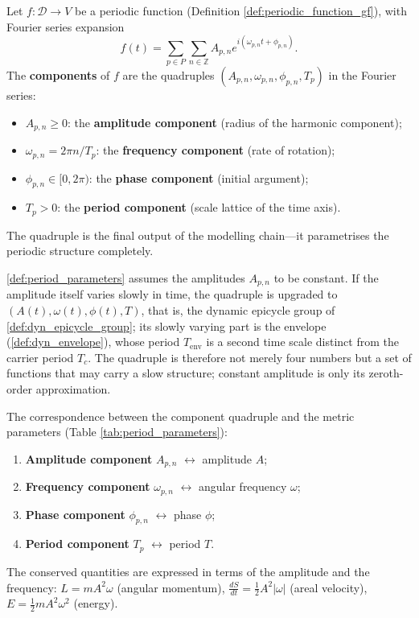 \begin{definition}\label{def:period_parameters}
Let $f: \mathcal{D} \to V$ be a periodic function (Definition \ref{def:periodic_function_gf}), with Fourier series expansion
\[
f(t) = \sum_{p \in P} \sum_{n \in \mathbb{Z}} A_{p,n} e^{i(\omega_{p,n} t + \phi_{p,n})}.
\]
The \textbf{components} of $f$ are the quadruples $(A_{p,n}, \omega_{p,n}, \phi_{p,n}, T_p)$ in the Fourier series:
\begin{itemize}
    \item $A_{p,n} \ge 0$: the \textbf{amplitude component} (radius of the harmonic component);
    \item $\omega_{p,n} = 2\pi n / T_p$: the \textbf{frequency component} (rate of rotation);
    \item $\phi_{p,n} \in [0, 2\pi)$: the \textbf{phase component} (initial argument);
    \item $T_p > 0$: the \textbf{period component} (scale lattice of the time axis).
\end{itemize}
The quadruple is the final output of the modelling chain---it parametrises the periodic structure completely.
\end{definition}

\begin{remark}\label{rem:period_parameters_time_varying}
\cref{def:period_parameters} assumes the amplitudes $A_{p,n}$ to be constant. If the amplitude itself varies slowly in time, the quadruple is upgraded to $(A(t),\omega(t),\phi(t),T)$, that is, the dynamic epicycle group of \cref{def:dyn_epicycle_group}; its slowly varying part is the envelope (\cref{def:dyn_envelope}), whose period $T_{\text{env}}$ is a second time scale distinct from the carrier period $T_c$. The quadruple is therefore not merely four numbers but a set of functions that may carry a slow structure; constant amplitude is only its zeroth-order approximation.
\end{remark}

\begin{property}\label{ch9_period_params_property}
The correspondence between the component quadruple and the metric parameters (Table \ref{tab:period_parameters}):
\begin{enumerate}[label=(\roman*)]
    \item \textbf{Amplitude component} $A_{p,n}$ $\leftrightarrow$ amplitude $A$;
    \item \textbf{Frequency component} $\omega_{p,n}$ $\leftrightarrow$ angular frequency $\omega$;
    \item \textbf{Phase component} $\phi_{p,n}$ $\leftrightarrow$ phase $\phi$;
    \item \textbf{Period component} $T_p$ $\leftrightarrow$ period $T$.
\end{enumerate}
The conserved quantities are expressed in terms of the amplitude and the frequency: $L = mA^2\omega$ (angular momentum), $\frac{dS}{dt} = \frac12 A^2|\omega|$ (areal velocity), $E = \frac12 mA^2\omega^2$ (energy).
\end{property}

